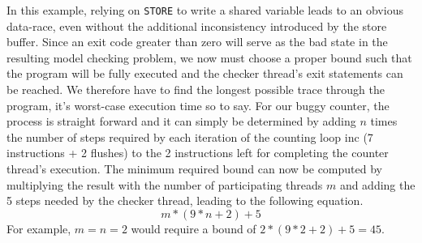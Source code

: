 In this example, relying on \lstinline[style=asm]{STORE} to write a shared variable leads to an obvious data-race, even without the additional inconsistency introduced by the store buffer.
Since an exit code greater than zero will serve as the bad state in the resulting model checking problem, we now must choose a proper bound
such that the program will be fully executed
and the checker thread's exit statements can be reached.
We therefore have to find the longest possible trace through the program, it's worst-case execution time so to say.
For our buggy counter, the process is straight forward and it can simply be determined by adding $n$ times the number of steps required by each iteration of the counting loop {\color{red!60!black}\textsf{inc}} (7 instructions + 2 flushes) to the 2 instructions left for completing the counter thread's execution.
The minimum required bound can now be computed by multiplying the result with the number of participating threads $m$ and adding the 5 steps needed by the checker thread, leading to the following equation.
\[
  m * (9 * n + 2) + 5
\]
For example, $m = n = 2$ would require a bound of $2 * (9 * 2 + 2) + 5 = 45$.


